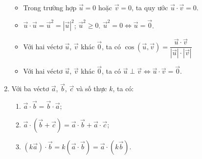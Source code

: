 \begin{enumerate}[\iconMT]
	\vspace{-0.6cm}
	\begin{note}
		\begin{itemize}
			\item[\ding{172}] Trong trường hợp $\vec{u}=0$ hoặc $\vec{v}=0$, ta quy ước $\vec{u} \cdot \vec{v}=0$.
			\item[\ding{173}]  $\vec{u} \cdot \vec{u}=\vec{u}^2=|\vec{u}|^2$; \quad $\vec{u}^2 \geqslant 0$. $ \vec{u}^2 = 0 \Leftrightarrow \vec{u}=\vec{0}$.
			\item[\ding{174}]  Với hai véctơ $\vec{u}$, $\vec{v}$ khác $\vec{0}$, ta có $\cos (\vec{u},\vec{v}) = \dfrac{\vec{u} \cdot \vec{v}}{|\vec{u}| \cdot |\vec{v}|}$
			\item[\ding{175}]  Với hai véctơ $\vec{u}$, $\vec{v}$ khác $\vec{0}$, ta có $\vec{u} \perp \vec{v}  \Leftrightarrow \vec{u} \cdot \vec{v}= \vec{0}$.
		\end{itemize}
	\end{note}
	\item {} Với ba véctơ $\vec{a}$, $\vec{b}$, $\vec{c}$ và số thực $k$, ta có:
	\begin{enumerate}[$\bullet$]
		\item $\vec{a}  \cdot \vec{b}= \vec{b} \cdot \vec{a}$;
		\item $\vec{a} \cdot \left( {\vec{b} + \vec{c}} \right) = \vec{a}  \cdot \vec{b} + \vec{a} \cdot \vec{c}$;
		\item $(k\vec{a}) \cdot \vec{b}= k(\vec{a}  \cdot \vec{b}) = \vec{a} \cdot (k\vec{b})$.
	\end{enumerate}
\end{enumerate}
